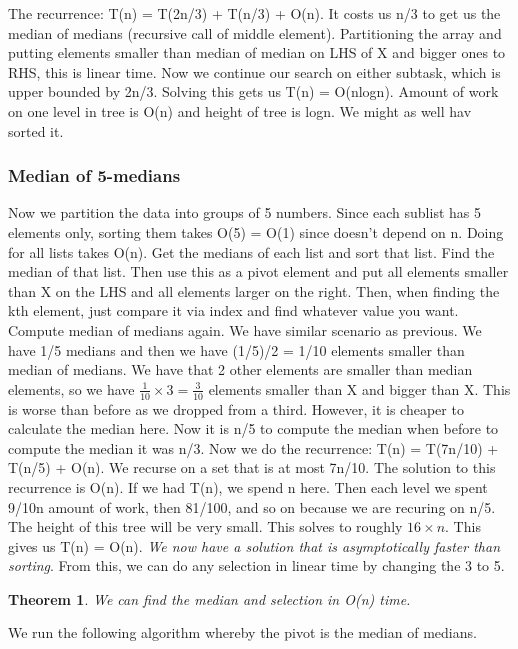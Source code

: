 \documentclass[11pt, oneside]{article}
\newtheorem{theorem}{Theorem}
\theoremstyle{definition}
\begin{document}
The recurrence: T(n) = T(2n/3) + T(n/3) + O(n). It costs us n/3 to get us the median of medians (recursive call of middle element). Partitioning the array and putting elements smaller than median of median on LHS of X and bigger ones to RHS, this is linear time. Now we continue our search on either subtask, which is upper bounded by 2n/3. Solving this gets us T(n) = O(nlogn). Amount of work on one level in tree is O(n) and height of tree is logn. We might as well hav sorted it.

\subsubsection{Median of 5-medians}
Now we partition the data into groups of 5 numbers. Since each sublist has 5 elements only, sorting them takes O(5) = O(1) since doesn't depend on n. Doing for all lists takes O(n). Get the medians of each list and sort that list. Find the median of that list. Then use this as a pivot element and put all elements smaller than X on the LHS and all elements larger on the right. Then, when finding the kth element, just compare it via index and find whatever value you want. Compute median of medians again. We have similar scenario as previous. We have 1/5 medians and then we have (1/5)/2 = 1/10 elements smaller than median of medians. We have that 2 other elements are smaller than median elements, so we have $\frac{1}{10} \times 3 = \frac{3}{10}$ elements smaller than X and bigger than X. This is worse than before as we dropped from a third. However, it is cheaper to calculate the median here. Now it is n/5 to compute the median when before to compute the median it was n/3. Now we do the recurrence: T(n) = T(7n/10) + T(n/5) + O(n). We recurse on a set that is at most 7n/10. The solution to this recurrence is O(n). If we had T(n), we spend n here. Then each level we spent 9/10n amount of work, then 81/100, and so on because we are recuring on n/5. The height of this tree will be very small. This solves to roughly $16\times n$. This gives us T(n) = O(n). \textit{We now have a solution that is asymptotically faster than sorting}. From this, we can do any selection in linear time by changing the 3 to 5.

\begin{theorem}
    We can find the median and selection in O(n) time.
\end{theorem}

We run the following algorithm whereby the pivot is the median of medians.
\end{document}
